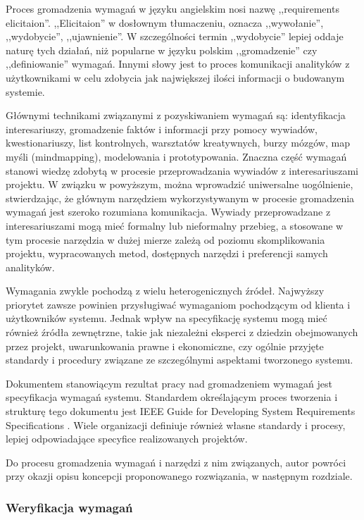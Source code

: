        Proces gromadzenia wymagań w języku angielskim nosi nazwę ,,requirements elicitaion''. ,,Elicitaion'' w dosłownym tłumaczeniu, oznacza ,,wywołanie'', ,,wydobycie'', ,,ujawnienie''. W szczególności termin ,,wydobycie'' lepiej oddaje naturę tych działań, niż popularne w języku polskim ,,gromadzenie'' czy ,,definiowanie'' wymagań. Innymi słowy jest to proces komunikacji analityków z użytkownikami w celu zdobycia jak największej ilości informacji o budowanym systemie. 

        Głównymi technikami związanymi z pozyskiwaniem wymagań są: identyfikacja interesariuszy, gromadzenie faktów i informacji przy pomocy wywiadów, kwestionariuszy, list kontrolnych, warsztatów kreatywnych, burzy mózgów, map myśli (mindmapping), modelowania i prototypowania. Znaczna część wymagań stanowi wiedzę zdobytą w procesie przeprowadzania wywiadów z interesariuszami projektu. W związku w powyższym, można wprowadzić uniwersalne uogólnienie, stwierdzając, że głównym narzędziem wykorzystywanym w procesie gromadzenia wymagań jest szeroko rozumiana komunikacja. Wywiady przeprowadzane z interesariuszami mogą mieć formalny lub nieformalny przebieg, a stosowane w tym procesie narzędzia w dużej mierze zależą od poziomu skomplikowania projektu, wypracowanych metod, dostępnych narzędzi i preferencji samych analityków. 
        
        Wymagania zwykle pochodzą z wielu heterogenicznych źródeł. Najwyższy priorytet zawsze powinien przysługiwać wymaganiom pochodzącym od klienta i użytkowników systemu. Jednak wpływ na specyfikację systemu mogą mieć również źródła zewnętrzne, takie jak niezależni eksperci z dziedzin obejmowanych przez projekt, uwarunkowania prawne i ekonomiczne, czy ogólnie przyjęte standardy i procedury związane ze szczególnymi aspektami tworzonego systemu.

        Dokumentem stanowiącym rezultat pracy nad gromadzeniem wymagań jest specyfikacja wymagań systemu. Standardem określającym proces tworzenia i strukturę tego dokumentu jest IEEE Guide for Developing System Requirements Specifications \cite{institute1984ieee}. Wiele organizacji definiuje również własne standardy i procesy, lepiej odpowiadające specyfice realizowanych projektów.

        Do procesu gromadzenia wymagań i narzędzi z nim związanych, autor powróci przy okazji opisu koncepcji proponowanego rozwiązania, w następnym rozdziale.

      \subsubsection{Weryfikacja wymagań}

